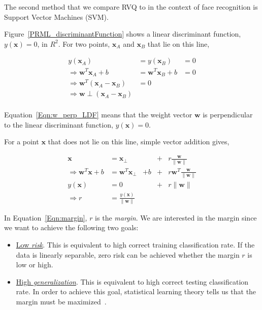 \begin{Body}
The second method that we compare RVQ to in the context of face recognition is Support Vector Machines (SVM).  

Figure~\ref{PRML_discriminantFunction} shows a linear discriminant function, $y(\mathbf{x})=0$, in $R^2$.  For two points, $\mathbf{x}_A$ and $\mathbf{x}_B$ that lie on this line,

\begin{equation}
\begin{array}{lll}
y(\textbf{x}_A)					&=		y(\textbf{x}_B)					&=0\\
\Rightarrow \mathbf{w}^T\mathbf{x}_A+b	&=		\mathbf{w}^T\mathbf{x}_B+b	&=0\\
\Rightarrow \mathbf{w}^T(\mathbf{x}_A-\mathbf{x}_B)			&=0\\
\Rightarrow \mathbf{w} \perp (\mathbf{x}_A-\mathbf{x}_B)\\
\end{array}
\label{Eqn:w_perp_LDF}
\end{equation}

Equation~\ref{Eqn:w_perp_LDF} means that the weight vector $\mathbf{w}$ is perpendicular to the linear discriminant function, $y(\mathbf{x})=0$.  

For a point $\mathbf{x}$ that does not lie on this line, simple vector addition gives,

\begin{equation}
\begin{array}{clllll}
\mathbf{x}		&=\mathbf{x}_{\perp} &&+ &r\frac{\mathbf{w}}{\|\mathbf{w}\|}\\
\Rightarrow \mathbf{w}^T\mathbf{x} +b		&=\mathbf{w}^T\mathbf{x}_{\perp} &+ b &+ &r \mathbf{w}^T \frac{\mathbf{w}}{\|\mathbf{w}\|}\\
y(\mathbf{x}) &= 0 && + &r\|\mathbf{w}\|\\
\Rightarrow r&=\frac{y(\mathbf{x})}{\|\mathbf{w}\|}
\end{array}
\label{Eqn:margin}
\end{equation}

In Equation~\ref{Eqn:margin}, $r$ is the \emph{margin}.  We are interested in the margin since we want to achieve the following two goals:

\begin{itemize}
\item \underline{Low \emph{risk}}.  This is equivalent to high correct training classification rate.  If the data is linearly separable, zero risk can be achieved whether the margin $r$ is low or high.
\item \underline{High \emph{generalization}}.  This is equivalent to high correct testing classification rate.  In order to achieve this goal, statistical learning theory tells us that the margin must be maximized~\cite{1996_BOOK_PR_DevroyeGyorfiLugosi}.
\end{itemize}


\end{Body}
